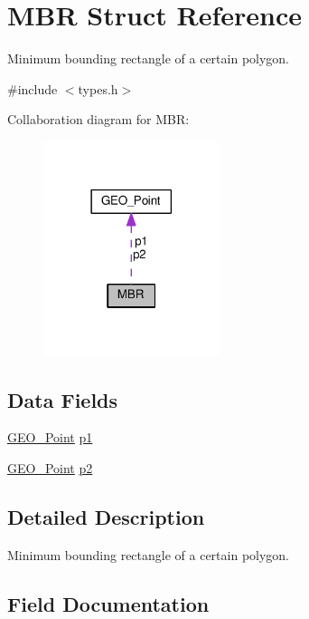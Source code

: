 \hypertarget{struct_m_b_r}{}\section{M\+BR Struct Reference}
\label{struct_m_b_r}


Minimum bounding rectangle of a certain polygon.  




{\ttfamily \#include $<$types.\+h$>$}



Collaboration diagram for M\+BR\+:\nopagebreak
\begin{figure}[H]
\begin{center}
\leavevmode
\includegraphics[width=146pt]{struct_m_b_r__coll__graph}
\end{center}
\end{figure}
\subsection*{Data Fields}
\begin{DoxyCompactItemize}
\item 
\hyperlink{struct_g_e_o___point}{G\+E\+O\+\_\+\+Point} \hyperlink{struct_m_b_r_aece77b6cba572ad1536ef0f6ce20cb82}{p1}
\item 
\hyperlink{struct_g_e_o___point}{G\+E\+O\+\_\+\+Point} \hyperlink{struct_m_b_r_a51a95439187066c7cc5f32a60cdef5a6}{p2}
\end{DoxyCompactItemize}


\subsection{Detailed Description}
Minimum bounding rectangle of a certain polygon. 

\subsection{Field Documentation}
